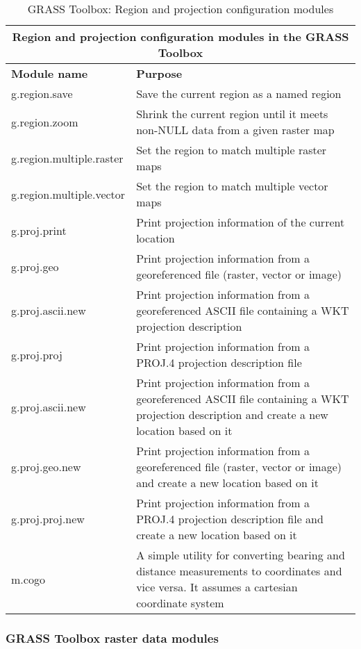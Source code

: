 \begin{table}[ht]
\centering
\caption{GRASS Toolbox: Region and projection configuration modules}\medskip
 \begin{tabular}{|p{4cm}|p{12cm}|}
  \hline \multicolumn{2}{|c|}{\textbf{Region and projection configuration
  modules in the GRASS Toolbox}} \\
  \hline \textbf{Module name} & \textbf{Purpose} \\
  \hline g.region.save & Save the current region as a named region \\
  \hline g.region.zoom & Shrink the current region until it meets non-NULL
   data from a given raster map \\
  \hline g.region.multiple.raster & Set the region to match multiple raster
  maps \\
  \hline g.region.multiple.vector & Set the region to match multiple vector
  maps \\
  \hline g.proj.print & Print projection information of the current location\\
  \hline g.proj.geo & Print projection information from a georeferenced file
  (raster, vector or image)\\
  \hline g.proj.ascii.new & Print projection information from a
  georeferenced ASCII file containing a WKT projection description\\
  \hline g.proj.proj & Print projection information from a PROJ.4 projection
  description file\\
  \hline g.proj.ascii.new & Print projection information from a georeferenced
  ASCII file containing a WKT projection description and create a new
  location based on it\\
  \hline g.proj.geo.new & Print projection information from a georeferenced
  file (raster, vector or image) and create a new location based on it\\
  \hline g.proj.proj.new & Print projection information from a PROJ.4
  projection description file and create a new location based on it \\
  \hline m.cogo & A simple utility for converting bearing and distance
  measurements to coordinates and vice versa. It assumes a cartesian
  coordinate system \\
\hline
\end{tabular}
\end{table}

\clearpage

\subsubsection{GRASS Toolbox raster data modules}


